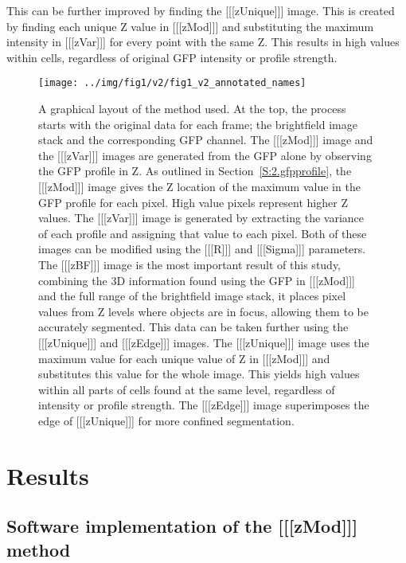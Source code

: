 \documentclass[preprint,11pt,5p,twocolumn]{elsarticle}
\begin{document}
This can be further improved by finding the [[[zUnique]]] image. This is created by finding each unique Z value in [[[zMod]]] and substituting the maximum intensity in [[[zVar]]] for every point with the same Z. This results in high values within cells, regardless of original GFP intensity or profile strength.

\begin{figure}[h]
\centering\texttt{[image: ../img/fig1/v2/fig1\_v2\_annotated\_names]}
\label{fig:method_flowchart}
\caption{A graphical layout of the method used. At the top, the process starts with the original data for each frame; the brightfield image stack and the corresponding GFP channel. The [[[zMod]]] image and the [[[zVar]]] images are generated from the GFP alone by observing the GFP profile in Z. As outlined in Section~\ref{S:2.gfpprofile}, the [[[zMod]]] image gives the Z location of the maximum value in the GFP profile for each pixel. High value pixels represent higher Z values. The [[[zVar]]] image is generated by extracting the variance of each profile and assigning that value to each pixel. Both of these images can be modified using the [[[R]]] and [[[Sigma]]] parameters. The [[[zBF]]] image is the most important result of this study, combining the 3D information found using the GFP in [[[zMod]]] and the full range of the brightfield image stack, it places pixel values from Z levels where objects are in focus, allowing them to be accurately segmented. This data can be taken further using the [[[zUnique]]] and [[[zEdge]]] images. The [[[zUnique]]] image uses the maximum value for each unique value of Z in [[[zMod]]] and substitutes this value for the whole image. This yields high values within all parts of cells found at the same level, regardless of intensity or profile strength. The [[[zEdge]]] image superimposes the edge of [[[zUnique]]] for more confined segmentation.}
\end{figure}

\section{Results}
\label{S:results}

\subsection{Software implementation of the [[[zMod]]] method}
\end{document}

